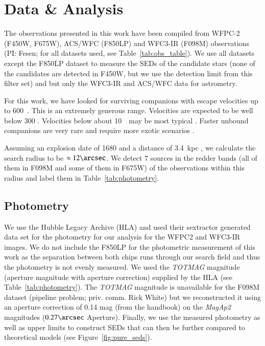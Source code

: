 \documentclass{aa}
\begin{document}
\section{Data \& Analysis}
\label{sec:data_analysis}
The observations presented in this work have been compiled from WFPC-2 (F450W, F675W), ACS/WFC (F850LP) and WFC3-IR (F098M) observations (PI: Fesen; for all datasets used, see Table~\ref{tab:obs_table}). We use all datasets except the F850LP dataset to measure the SEDs of the candidate stars (none of the candidates are detected in F450W, but we use the detection limit from this filter set) and but only the WFC3-IR and ACS/WFC data for astrometry.

For this work, we have looked for surviving companions with escape velocities up to 600~\kms. This is an extremely generous range. Velocities are expected to be well below 300 \kms  \citep[e.g.][]{2011MNRAS.414.3501E}. Velocities below about 10~\kms\ may be most typical \citep{2018arXiv180409164R}.  Faster unbound companions are very rare and require more exotic scenarios \citep[cf.][]{2015MNRAS.448L...6T}.


Assuming an explosion date of 1680 \citep{2001AJ....122..297T} and a distance of 3.4~kpc \citep{1995ApJ...440..706R}, we calculate the search radius to be $\approx12\arcsec$. We detect 7 sources in the redder bands (all of them in F098M and some of them in F675W) of the observations within this radius and label them in Table~\ref{tab:photometry}.



\subsection{Photometry}
We use the Hubble Legacy Archive (HLA) and used their \gls{sextractor} generated data set for the photometry for our analysis for the WFPC2 and WFC3-IR images. We do not include the F850LP for the photometric measurement of this work as the separation between both chips runs through our search field and thus the photometry is not evenly measured. We used the \textit{TOTMAG} magnitude (aperture magnitude with aperture correction) supplied by the HLA (see Table~\ref{tab:photometry}). The \textit{TOTMAG} magnitude is unavailable for the F098M dataset (pipeline problem; priv. comm.  Rick White) but we reconstructed it using an aperture correction of 0.14 mag (from the handbook) on the \textit{MagAp2} magnitudes  ($0.27\arcsec$ Aperture). Finally, we use the measured photometry as well as upper limits to construct SEDs \citep[using the synthetic photometry package \gls{wsynphot};][]{kerzendorf_wolfgang_2018_1321241} that can then be further compared to theoretical models (see Figure~\ref{fig:pure_seds}).
\end{document}
